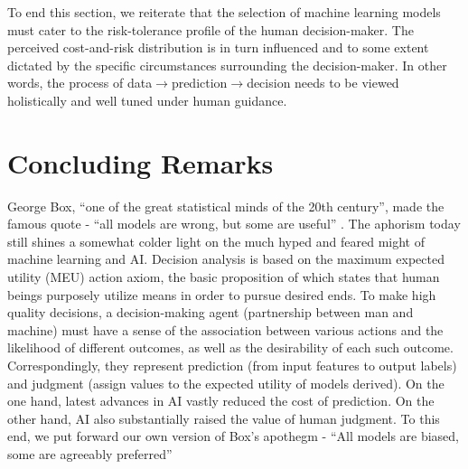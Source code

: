 \documentclass[deca,nonblindrev]{informs3} %
\begin{document}
To end this section, we reiterate that the selection of machine learning models must cater to the risk-tolerance profile of the human decision-maker. The perceived cost-and-risk distribution is in turn influenced and to some extent  dictated by the specific circumstances  surrounding the decision-maker. In other  words, the process of  data$\to$prediction$\to$decision needs to be viewed holistically and well tuned under human guidance.



\section {Concluding Remarks}

George Box, ``one of the great statistical minds of the 20th century'',  made the famous quote - ``all models are wrong, but some are useful'' \citep[p. 424]{box1987empirical}.  The aphorism today still shines a somewhat colder light on the much hyped and feared might of machine learning and AI. Decision analysis is  based on the maximum expected utility (MEU) action axiom, the basic proposition of which states that  human beings purposely utilize means in order to pursue  desired ends. To make high quality decisions, a decision-making agent (partnership between man and machine)  must have a sense of the association between various actions and the likelihood of different outcomes, as well as the desirability of each such outcome. Correspondingly, they represent prediction (from input features to output labels) and judgment (assign values to the expected utility of models derived). On the one hand,  latest advances in AI vastly  reduced the cost of prediction. On the other hand, AI also substantially raised the value of human judgment. To this end, we put forward our own version of Box's apothegm -    ``All models are biased, some are agreeably  preferred''


\ACKNOWLEDGMENT{%
}%


%
%
%
\newpage
\end{document}
